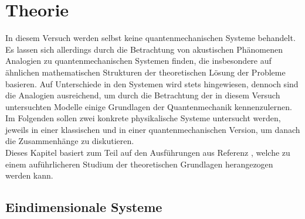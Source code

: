\section{Theorie}
\label{sec:Theorie}
In diesem Versuch werden selbst keine quantenmechanischen Systeme behandelt. Es lassen sich allerdings durch die Betrachtung von akustischen Phänomenen Analogien zu quantenmechanischen Systemen finden, die insbesondere auf ähnlichen mathematischen Strukturen der theoretischen Lösung der Probleme basieren. Auf Unterschiede in den Systemen wird stets hingewiesen, dennoch sind die Analogien ausreichend, um durch die Betrachtung der in diesem Versuch untersuchten Modelle einige Grundlagen der Quantenmechanik kennenzulernen. Im Folgenden sollen zwei konkrete physikalische Systeme untersucht werden, jeweils in einer klassischen und in einer quantenmechanischen Version, um danach die Zusammenhänge zu diskutieren.\\
Dieses Kapitel basiert zum Teil auf den Ausführungen aus Referenz \cite{anderesProtokoll}, welche zu einem auführlicheren Studium der theoretischen Grundlagen herangezogen werden kann.

\subsection{Eindimensionale Systeme}
\label{subsec:eindimsyst}
